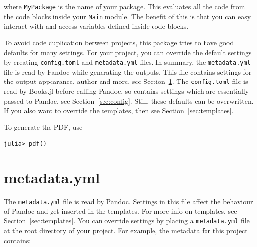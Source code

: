 \documentclass[
  notoc %
]{tufte-book}
\newcommand{\passthrough}[1]{#1}
\begin{document}
where \passthrough{\lstinline!MyPackage!} is the name of your package.
This evaluates all the code from the code blocks inside your
\passthrough{\lstinline!Main!} module. The benefit of this is that you
can easy interact with and access variables defined inside code blocks.

To avoid code duplication between projects, this package tries to have
good defaults for many settings. For your project, you can override the
default settings by creating \passthrough{\lstinline!config.toml!} and
\passthrough{\lstinline!metadata.yml!} files. In summary, the
\passthrough{\lstinline!metadata.yml!} file is read by Pandoc while
generating the outputs. This file contains settings for the output
appearance, author and more, see Section~\ref{sec:metadata}. The
\passthrough{\lstinline!config.toml!} file is read by Books.jl before
calling Pandoc, so contains settings which are essentially passed to
Pandoc, see Section~\ref{sec:config}. Still, these defaults can be
overwritten. If you also want to override the templates, then see
Section~\ref{sec:templates}.

To generate the PDF, use

\begin{lstlisting}
julia> pdf()
\end{lstlisting}

\hypertarget{sec:metadata}{%
\section{metadata.yml}\label{sec:metadata}}

The \passthrough{\lstinline!metadata.yml!} file is read by Pandoc.
Settings in this file affect the behaviour of Pandoc and get inserted in
the templates. For more info on templates, see
Section~\ref{sec:templates}. You can override settings by placing a
\passthrough{\lstinline!metadata.yml!} file at the root directory of
your project. For example, the metadata for this project contains:
\end{document}
